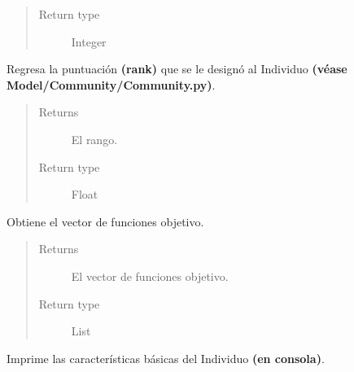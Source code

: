 \documentclass[letterpaper,10pt,english]{sphinxmanual}
\begin{document}
\begin{fulllineitems}
\begin{fulllineitems}
\begin{quote}
\begin{description}
\item[{Return type}] \leavevmode
Integer

\end{description}\end{quote}

\end{fulllineitems}


\begin{fulllineitems}
\label{Model/Community/Population/Individual/Individual:Model.Community.Population.Individual.Individual.Individual.get_rank}
Regresa la puntuación \textbf{(rank)} que se le designó al Individuo
\textbf{(véase Model/Community/Community.py)}.
\begin{quote}\begin{description}
\item[{Returns}] \leavevmode
El rango.

\item[{Return type}] \leavevmode
Float

\end{description}\end{quote}

\end{fulllineitems}


\begin{fulllineitems}
\label{Model/Community/Population/Individual/Individual:Model.Community.Population.Individual.Individual.Individual.get_vector_functions}
Obtiene el vector de funciones objetivo.
\begin{quote}\begin{description}
\item[{Returns}] \leavevmode
El vector de funciones objetivo.

\item[{Return type}] \leavevmode
List

\end{description}\end{quote}

\end{fulllineitems}


\begin{fulllineitems}
\label{Model/Community/Population/Individual/Individual:Model.Community.Population.Individual.Individual.Individual.print_info}
Imprime las características básicas del Individuo \textbf{(en consola)}.


\end{fulllineitems}
\end{fulllineitems}
\end{document}
